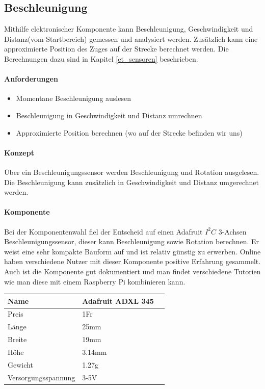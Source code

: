 \documentclass[../../main.tex]{subfiles}
\begin{document}
\subsection{Beschleunigung} \label{pi_beschleunigung}
Mithilfe elektronischer Komponente kann Beschleunigung, Geschwindigkeit und Distanz(vom Startbereich) gemessen und analysiert werden. Zusätzlich kann eine approximierte Position des Zuges auf der Strecke berechnet werden. Die Berechnungen dazu sind in Kapitel \ref{et_sensoren} beschrieben.

\paragraph{Anforderungen}
\begin{itemize}
    \item Momentane Beschleunigung auslesen
    \item Beschleunigung in Geschwindigkeit und Distanz umrechnen
    \item Approximierte Position berechnen (wo auf der Strecke befinden wir uns)
\end{itemize}

\paragraph{Konzept}
Über ein Beschleunigungssensor werden Beschleunigung und Rotation ausgelesen. Die Beschleunigung kann zusätzlich in Geschwindigkeit und Distanz umgerechnet werden.

\paragraph{Komponente}
Bei der Komponentenwahl fiel der Entscheid auf einen Adafruit $I^2C$ 3-Achsen Beschleunigungssensor, dieser kann Beschleunigung sowie Rotation berechnen. Er weist eine sehr kompakte Bauform auf und ist relativ günstig zu erwerben. Online haben verschiedene Nutzer mit dieser Komponente positive Erfahrung gesammelt. Auch ist die Komponente gut dokumentiert und man findet verschiedene Tutorien wie man diese mit einem Raspberry Pi kombinieren kann.

\begin{table}[H]
\begin{flushleft}
\begin{tabular}{lll}
Name & Adafruit ADXL 345  \\ \hline
Preis & 1Fr               \\ \hline
Länge & 25mm              \\ \hline
Breite & 19mm             \\ \hline
Höhe & 3.14mm             \\ \hline
Gewicht & 1.27g           \\ \hline
Versorgungsspannung & 3-5V \\ \hline
\end{tabular}
\end{flushleft}
\end{table}
\end{document}
